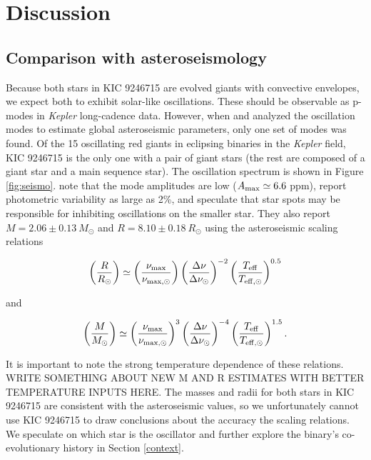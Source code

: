 \section{Discussion}\label{discuss}

\subsection{Comparison with asteroseismology}\label{seismo}

Because both stars in KIC 9246715 are evolved giants with convective envelopes, we expect both to exhibit solar-like oscillations. These should be observable as p-modes in \emph{Kepler} long-cadence data. However, when \citet{gau13} and \citet{gau14} analyzed the oscillation modes to estimate global asteroseismic parameters, only one set of modes was found. Of the 15 oscillating red giants in eclipsing binaries in the \emph{Kepler} field, KIC 9246715 is the only one with a pair of giant stars (the rest are composed of a giant star and a main sequence star). The oscillation spectrum is shown in Figure \ref{fig:seismo}. \citet{gau14} note that the mode amplitudes are low ($A_{\rm{max}} \simeq 6.6$ ppm), report photometric variability as large as 2\%, and speculate that star spots may be responsible for inhibiting oscillations on the smaller star. They also report $M = 2.06 \pm 0.13 \ M_{\odot}$ and $R = 8.10 \pm 0.18 \ R_{\odot}$ using the asteroseismic scaling relations

\begin{equation}
\left( \frac{R}{R_\odot} \right) \simeq \left( \frac{\nu_{\rm{max}}}{\nu_{\rm{max,\odot}}} \right) \left( \frac{\Delta \nu}{\Delta \nu_\odot} \right)^{-2} \left( \frac{T_{\rm{eff}}}{T_{\rm{eff,\odot}}} \right)^{0.5}
\end{equation}\label{radeq}

and

\begin{equation}
\left( \frac{M}{M_\odot} \right) \simeq {\left( \frac{\nu_{\rm{max}}}{\nu_{\rm{max,\odot}}} \right)}^{3} \left( \frac{\Delta \nu}{\Delta \nu_\odot} \right)^{-4} \left( \frac{T_{\rm{eff}}}{T_{\rm{eff,\odot}}} \right)^{1.5}.
\end{equation}\label{masseq}

It is important to note the strong temperature dependence of these relations. WRITE SOMETHING ABOUT NEW M AND R ESTIMATES WITH BETTER TEMPERATURE INPUTS HERE. The masses and radii for both stars in KIC 9246715 are consistent with the asteroseismic values, so we unfortunately cannot use KIC 9246715 to draw conclusions about the accuracy the scaling relations. We speculate on which star is the oscillator and further explore the binary's co-evolutionary history in Section \ref{context}.

